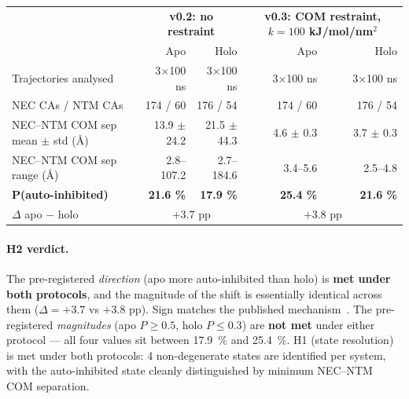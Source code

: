 \documentclass[11pt]{article}
\begin{document}
\begin{center}
\begin{tabularx}{\linewidth}{X r r r r}
\toprule
 & \multicolumn{2}{c}{\textbf{v0.2: no restraint}} & \multicolumn{2}{c}{\textbf{v0.3: COM restraint, $k=100$ kJ/mol/nm$^2$}} \\
 & Apo & Holo & Apo & Holo \\
\midrule
Trajectories analysed                 & 3$\times$100 ns & 3$\times$100 ns & 3$\times$100 ns & 3$\times$100 ns \\
NEC CAs / NTM CAs                     & 174 / 60       & 176 / 54       & 174 / 60       & 176 / 54 \\
NEC--NTM COM sep mean $\pm$ std (\AA) & 13.9 $\pm$ 24.2 & 21.5 $\pm$ 44.3 & 4.6 $\pm$ 0.3 & 3.7 $\pm$ 0.3 \\
NEC--NTM COM sep range (\AA)          & 2.8--107.2     & 2.7--184.6     & 3.4--5.6       & 2.5--4.8 \\
\textbf{P(auto-inhibited)}            & \textbf{21.6 \%} & \textbf{17.9 \%} & \textbf{25.4 \%} & \textbf{21.6 \%} \\
$\Delta$ apo $-$ holo                 & \multicolumn{2}{c}{$+3.7$ pp} & \multicolumn{2}{c}{$+3.8$ pp} \\
\bottomrule
\end{tabularx}
\end{center}

\paragraph{H2 verdict.} The pre-registered \emph{direction} (apo more
auto-inhibited than holo) is \textbf{met under both protocols}, and
the magnitude of the shift is essentially identical across them
($\Delta = +3.7$ vs $+3.8$ pp). Sign matches the published
mechanism~\cite{tiyanont2011exposure,wu2010antinrr}. The
pre-registered \emph{magnitudes} (apo $P \ge 0.5$, holo $P \le 0.3$)
are \textbf{not met} under either protocol --- all four values sit
between 17.9~\% and 25.4~\%. H1 (state resolution) is met under both
protocols: 4 non-degenerate states are identified per system, with
the auto-inhibited state cleanly distinguished by minimum NEC--NTM
COM separation.
\end{document}

